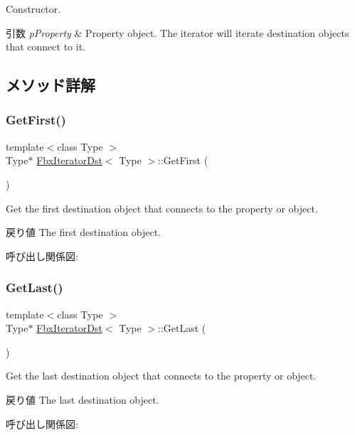 Constructor. 
\begin{DoxyParams}{引数}
{\em p\+Property} & Property object. The iterator will iterate destination objects that connect to it. \\
\hline
\end{DoxyParams}


\subsection{メソッド詳解}
\mbox{\label{class_fbx_iterator_dst_a7e04f14a4ad50293c81ad1b35b4a206a}} 
\subsubsection{\texorpdfstring{Get\+First()}{GetFirst()}}
{\footnotesize\ttfamily template$<$class Type $>$ \\
Type$\ast$ \hyperlink{class_fbx_iterator_dst}{Fbx\+Iterator\+Dst}$<$ Type $>$\+::Get\+First (\begin{DoxyParamCaption}{ }\end{DoxyParamCaption})}

Get the first destination object that connects to the property or object. \begin{DoxyReturn}{戻り値}
The first destination object. 
\end{DoxyReturn}
呼び出し関係図\+:
\mbox{\label{class_fbx_iterator_dst_ac3fdecd61bbc92465c40cb45a6557473}} 
\subsubsection{\texorpdfstring{Get\+Last()}{GetLast()}}
{\footnotesize\ttfamily template$<$class Type $>$ \\
Type$\ast$ \hyperlink{class_fbx_iterator_dst}{Fbx\+Iterator\+Dst}$<$ Type $>$\+::Get\+Last (\begin{DoxyParamCaption}{ }\end{DoxyParamCaption})}

Get the last destination object that connects to the property or object. \begin{DoxyReturn}{戻り値}
The last destination object. 
\end{DoxyReturn}
呼び出し関係図\+:
\mbox{\label{class_fbx_iterator_dst_a576a29d2fed0e256026665daeae3eb03}} 
